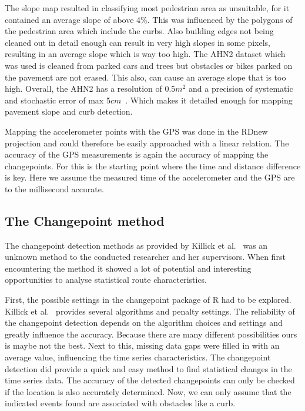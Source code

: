 The slope map resulted in classifying most pedestrian area as unsuitable, for it contained an average slope of above 4\%. This was influenced by the polygons of the pedestrian area which include the curbs. Also building edges not being cleaned out in detail enough can result in very high slopes in some pixels, resulting in an average slope which is way too high. The AHN2 dataset which was used is cleaned from parked cars and trees but obstacles or bikes parked on the pavement are not erased. This also, can cause an average slope that is too high. Overall, the AHN2 has a resolution of 0.5$m^2$ and a precision of systematic and stochastic error of max 5$cm$~\cite{VanDerZon2013}. Which makes it detailed enough for mapping pavement slope and curb detection.

Mapping the accelerometer points with the GPS was done in the RDnew projection and could therefore be easily approached with a linear relation. The accuracy of the GPS measurements is again the accuracy of mapping the changepoints. For this is the starting point where the time and distance difference is key. Here we assume the measured time of the accelerometer and the GPS are to the millisecond accurate. 

\subsection{The Changepoint method}
The changepoint detection methods as provided by Killick et al.~\cite{changepoint2015} was an unknown method to the conducted researcher and her supervisors. When first encountering the method it showed a lot of potential and interesting opportunities to analyse statistical route characteristics. 

First, the possible settings in the changepoint package of R had to be explored. Killick et al.~\cite{changepoint2015} provides several algorithms and penalty settings. The reliability of the changepoint detection depends on the algorithm choices and settings and greatly influence the accuracy. Because there are many different possibilities ours is maybe not the best. Next to this, missing data gaps were filled in with an average value, influencing the time series characteristics. The changepoint detection did provide a quick and easy method to find statistical changes in the time series data. The accuracy of the detected changepoints can only be checked if the location is also accurately determined. Now, we can only assume that the indicated events found are associated with obstacles like a curb. 

